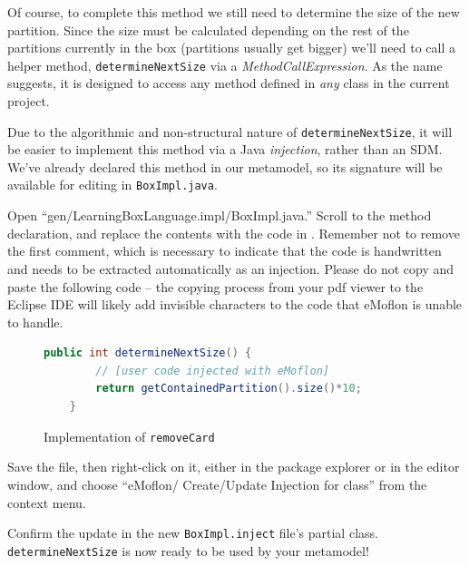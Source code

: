 Of course, to complete this method we still need to determine the size of the new partition. Since the size must be calculated depending on the
rest of the partitions currently in the box (partitions usually get bigger) we'll need to call a helper method, \texttt{determineNextSize} via a
\emph{MethodCallExpression}. As the name suggests, it is designed to access any method defined in \emph{any} class in the current
project.

Due to the algorithmic and non-structural nature of \texttt{determineNextSize}, it will be easier to implement this method via a Java \emph{injection}, rather
than an SDM. We've already declared this method in our metamodel, so its signature will be available for editing in \texttt{BoxImpl.java}.

\begin{stepbystep}

\item Open ``gen/LearningBoxLanguage.impl/BoxImpl.java.'' Scroll to the method declaration, and replace the contents with the code in
. Remember not to remove the first comment, which is necessary to indicate that the code is handwritten and needs to be
extracted automatically as an injection. Please do not copy and paste the following code -- the copying process from your pdf viewer to the Eclipse IDE
will likely add invisible characters to the code that eMoflon is unable to handle.

\begin{figure}[htbp]
        \centering
        \begin{lstlisting}[language=Java, keywordstyle={\bfseries\color{purple}}, backgroundcolor=\color{white}]
    public int determineNextSize() {
    	// [user code injected with eMoflon]
        return getContainedPartition().size()*10;
    }
        \end{lstlisting}
        \caption{Implementation of \texttt{removeCard}}
        \label{code:determineNextSize_impl}
\end{figure}


\item Save the file, then right-click on it, either in the package explorer or in the editor window, and choose ``eMoflon/
Create/Update Injection for class'' from the context menu. 

\item Confirm the update in the new \texttt{BoxImpl.inject} file's partial class. \texttt{determineNextSize} is now ready to be used by
your metamodel!

\end{stepbystep}


